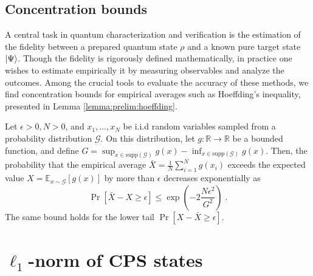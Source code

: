 \documentclass[a4paper,twocolumn,11pt,unpublished]{quantumarticle}
\newcommand{\dist}{\mathcal G} %
\begin{document}
\subsection{Concentration bounds}
\label{subsection:prelim:concentration}
A central task in quantum characterization and verification is the estimation of the fidelity between a prepared quantum state $\rho$ and a known pure target state $\ket{\Psi}$. Though the fidelity is rigorously defined mathematically, in practice one wishes to estimate empirically it by measuring observables and analyze the outcomes. Among the crucial tools to evaluate the accuracy of these methods, we find concentration bounds for empirical averages such as Hoeffding's inequality, presented in Lemma \ref{lemma:prelim:hoeffding}.
\begin{lemma}
\label{lemma:prelim:hoeffding}
    Let $\epsilon>0, N>0$, and
    $x_1, \ldots, x_N$ be i.i.d random variables sampled from a probability distribution $\dist$. On this distribution, let $g:\mathbb R \rightarrow \mathbb R$ be a bounded function, and define $G = \sup_{x\in\mathrm{supp}(\dist)}g(x)-\inf_{x\in\mathrm{supp}(\dist)}g(x)$. Then, the probability that the empirical average $\bar X = \frac 1 N \sum_{i=1}^N g(x_{i})$ exceeds the expected value $X=\mathbb E_{x\sim\dist}[g(x)]$ by more than $\epsilon$ decreases exponentially as
    \begin{equation}
        \Pr\left[
        \bar X
        -
        X
        \geq \epsilon
        \right]
        \leq
        \exp{
        \left(
        -2\dfrac{N\epsilon^2}{G^2}
        \right)
        }\; .
    \end{equation}
    The same bound holds for the lower tail $\Pr[X - \bar X \geq \epsilon]$.
\end{lemma}



\section{$\ell_1$-norm of CPS states}
\label{appendix:l-1 norm of CPS}
\end{document}
